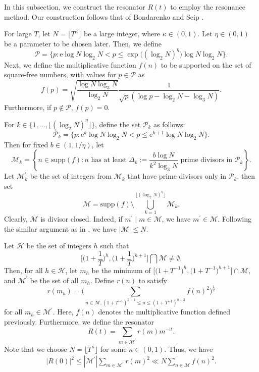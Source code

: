 \documentclass[10pt,a4paper]{amsart}
\numberwithin{equation}{section}
\newcommand{\bg}{\big}
\newcommand{\bgg}{\bigg}
\newcommand{\Bgl}{\Big(}
\newcommand{\Bgr}{\Big)}
\newcommand{\lo}{\log_2}
\newcommand{\lt}{\log_3}
\newcommand{\inv}{^{-1}}
\newcommand{\mch}{\mathcal{H}}
\newcommand{\mcp}{\mathcal{P}}
\newcommand{\mcm}{\mathcal{M}}
\newcommand{\mme}{\mathrm{e}}
\newcommand{\mit}{\mathrm{i}t}
\begin{document}
In this subsection, we construct the resonator \(R(t)\) to employ the resonance method. Our construction follows that of Bondarenko and Seip \cite{bondarenko2018argument}.
\par
For large \(T\), let \(N = \lfloor T^\kappa \rfloor\) be a large integer, where \(\kappa \in (0,1)\). Let \(\eta \in (0,1)\) be a parameter to be chosen later. Then, we define 
\[
\mcp = \bg\{p : \mme \log N \log_{2}N < p \leq \exp\bg((\log_2 N)^{\eta}\bg) \log N \log_{2}N \bg\}.
\]
Next, we define the multiplicative function \(f(n)\) to be supported on the set of square-free numbers, with values for \(p \in \mcp\) as
\[
f(p)=\sqrt{\frac{\log N \lt N}{\lo N}} \frac{1}{\sqrt{p}(\log p - \lo N-\lt N)}.
\]
Furthermore, if \(p \notin \mcp\), \(f(p)=0\).
\par
For \(k \in \bg\{1,\dots, \lfloor (\log_2 N)^{\eta} \rfloor\bg\}\), define the set \(\mcp_k\) as follows:
\[
\mathcal{P}_{k} = \bg\{p : \mme^k \log N \log_{2}N < p \leq \mme^{k+1} \log N\log_{2}N \bg\}.
\]
Then for fixed \(b \in (1,1/\eta)\), let
\[
\mathcal{M}_{k} = \left\{ n \in \mathrm{supp}(f) : n \text{ has at least } \Delta_k := \frac{b \log N }{k^2 \log_3 N} \text{ prime divisors in } \mathcal{P}_{k} \right\}.
\]
Let \(\mathcal{M}^{\prime}_{k}\) be the set of integers from \(\mathcal{M}_{k}\) that have prime divisors only in \(\mathcal{P}_{k}\), then set
\[
\mathcal{M} = \mathrm{supp}(f) \setminus \bigcup_{k = 1}^{\lfloor(\log_2 N)^{\eta}\rfloor} \mathcal{M}_{k}.
\]
Clearly, \(\mathcal{M}\) is divisor closed. Indeed, if \(m^{\prime} \mid m \in \mathcal{M}\), we have \(m^{\prime} \in \mathcal{M}\). Following the similar argument as in \cite[Lemma 2]{bondarenko2017large}, we have \(|\mcm| \le N\).
\par
Let \(\mch\) be the set of integers \(h\) such that 
\[
\bgg[\Bgl1+\frac{1}{T} \Bgr^h, \Bgl1+\frac{1}{T} \Bgr^{h+1} \bgg] \bigcap \mcm \neq \emptyset.
\]
Then, for all \(h \in \mch\), let \(m_h\) be the minimum of \(\bg[\bg(1+T\inv\bg)^h, \bg(1+T\inv\bg)^{h+1}\bg] \cap \mcm\), and \(\mcm^\prime\) be the set of all \(m_h\). Define \(r(n)\) to satisfy
\[
r(m_h) = \Bigg( \sum_{n \in \mathcal{M},  (1 +T\inv)^{h - 1} \le n \le (1 + T\inv)^{h + 2}} f(n)^2 \Bigg)^{\frac{1}{2}}
\]
for all \(m_h \in \mcm^\prime\). Here, \(f(n)\) denotes the multiplicative function defined previously. Furthermore, we define the resonator
\[
R(t) = \sum_{m \in \mcm^{\prime}}r(m)m^{-\mit}.
\]
Note that we choose \(N = \lfloor T^\kappa \rfloor\) for some \(\kappa \in (0,1)\). Thus, we have
\begin{align}
\label{R0-upper}
    |R(0)|^2 \le |\mcm^\prime|\sum_{m \in \mcm^\prime} r(m)^2 \ll N \sum_{n \in \mcm}f(n)^2.
\end{align}
\end{document}
